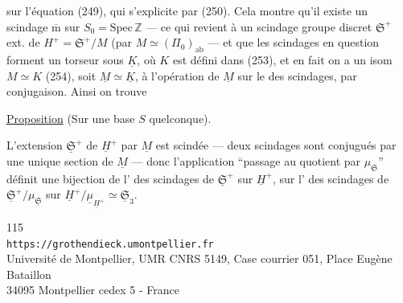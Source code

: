 sur l'équation (249), qui s'explicite par (250).
Cela montre qu'il existe un scindage
$\overline{\mathrm m}$ sur $S_0=\mathrm{Spec}\,\mathbb Z$
--- ce qui revient à un scindage  groupe discret
$\mathfrak S^+$ ext. de
$H^+=\mathfrak S^+/M$
(par $M\simeq(\Pi_0)_{\mathrm{ab}}$ \unsure{)}
--- et que les scindages en question forment un
torseur sous $\underline K$, où $K$
est défini dans (253), et en fait 
on a un isom $M\simeq K$ (254), soit
$\underline M\simeq\underline K$, 
à l'opération de $\underline M$ sur le 
des scindages, par conjugaison. Ainsi on trouve

\uline{Proposition} (Sur une base $S$ quelconque).

L'extension $\underline{\mathfrak S}^+$ de
$\underline H^+$ par $\underline M$ est scindée ---
deux scindages sont conjugués par une unique section
de $\underline M$ --- donc l'application 
``passage au quotient par $\mu_{\mathfrak S}$'' définit une
bijection de l' des scindages de
$\underline{\mathfrak S}^+$ sur $\underline H^+$,
sur l' des scindages de
$\underline{\mathfrak S}^+/\mu_{\underline{\mathfrak S}}$
sur $\underline H^+/\underline\mu_{\underline H^+}
\simeq\underline{\mathfrak S}_3$.


\begin{center}
\small
115\\
\texttt{https://grothendieck.umontpellier.fr}\\
Université de Montpellier, UMR CNRS 5149, Case courrier 051, Place Eugène Bataillon\\
34095 Montpellier cedex 5 - France
\end{center}

